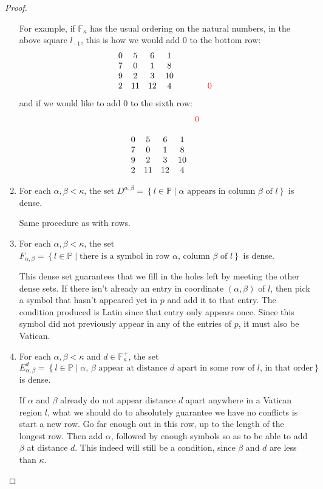 \documentclass[12pt,a4paper]{article}
\newcommand{\F}{\mathbb{F}}
\newcommand{\st}{\; | \;}
\newcommand{\set}[2]{\left\{#1\st #2 \right\}}
\renewcommand{\P}{\mathbb{P}}
\begin{document}
\begin{proof}
\begin{enumerate}
	For example, if $\F_\kappa$ has the usual ordering on the natural numbers, in the above square $l_{-1}$, this is how we would add 0 to the bottom row:
$$\begin{array}{cccccccc}
	0 & 5 & 6 & 1 \\ 
	7 &  0 & 1 & 8  \\
	9 & 2 & 3 & 10 \\
	2 & 11 & 12 & 4 & & & & \color{red}0
\end{array}$$
and if we would like to add 0 to the sixth row:
$$\begin{array}{ccccccc}
	 & & & & \color{red} 0\\
	 &  & & \\
	0 & 5 & 6 & 1 \\ 
	7 &  0 & 1 & 8 \\
	9 & 2 & 3 & 10 \\
	2 & 11 & 12 & 4
\end{array}$$

	
	\item For each $\alpha, \beta <\kappa$, the set $D^{\alpha,\beta}=\set{l \in \P}{\alpha \text{ appears in column } \beta \text{ of } l}$ is dense.
	
	Same procedure as with rows.	
	
	\item For each $\alpha, \beta < \kappa$, the set $F_{\alpha, \beta}=\set{l \in \P}{\text{there is a symbol in row $\alpha$, column $\beta$ of $l$}}$ is dense.
	
	This dense set guarantees that we fill in the holes left by meeting the other dense sets. If there isn't already an entry in coordinate $(\alpha, \beta)$ of $l$, then pick a symbol that hasn't appeared yet in $p$ and add it to that entry. The condition produced is Latin since that entry only appears once. Since this symbol did not previously appear in any of the entries of $p$, it must also be Vatican.
	
	\item For each $\alpha, \beta<\kappa$ and $d \in \F_\kappa^+$, the set $$E^d_{\alpha, \beta}=\set{l \in \P}{\text{$\alpha$, $\beta$ appear at distance $d$ apart in some row of $l$, in that order}}$$ is dense.
	
	If $\alpha$ and $\beta$ already do not appear distance $d$ apart anywhere in a Vatican region $l$, what we should do to absolutely guarantee we have no conflicts is start a new row. Go far enough out in this row, up to the length of the longest row. Then add $\alpha$, followed by enough symbols so as to be able to add $\beta$ at distance $d$. This indeed will still be a condition, since $\beta$ and $d$ are less than $\kappa$.
	

\end{enumerate}
\end{proof}
\end{document}

